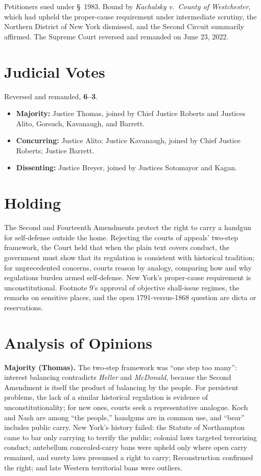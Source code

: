 \documentclass[12pt]{article}
\begin{document}
Petitioners sued under \S~1983. Bound by \textit{Kachalsky v.\ County of Westchester}, which had upheld the proper-cause requirement under intermediate scrutiny, the Northern District of New York dismissed, and the Second Circuit summarily affirmed. The Supreme Court reversed and remanded on June 23, 2022.

\section{Judicial Votes}

Reversed and remanded, \textbf{6--3}.
\begin{itemize}
\item \textbf{Majority:} Justice Thomas, joined by Chief Justice Roberts and Justices Alito, Gorsuch, Kavanaugh, and Barrett.
\item \textbf{Concurring:} Justice Alito; Justice Kavanaugh, joined by Chief Justice Roberts; Justice Barrett.
\item \textbf{Dissenting:} Justice Breyer, joined by Justices Sotomayor and Kagan.
\end{itemize}

\section{Holding}

The Second and Fourteenth Amendments protect the right to carry a handgun for self-defense outside the home. Rejecting the courts of appeals' two-step framework, the Court held that when the plain text covers conduct, the government must show that its regulation is consistent with historical tradition; for unprecedented concerns, courts reason by analogy, comparing how and why regulations burden armed self-defense. New York's proper-cause requirement is unconstitutional. Footnote 9's approval of objective shall-issue regimes, the remarks on sensitive places, and the open 1791-versus-1868 question are dicta or reservations.

\section{Analysis of Opinions}

\textbf{Majority (Thomas).} The two-step framework was ``one step too many'': interest balancing contradicts \textit{Heller} and \textit{McDonald}, because the Second Amendment is itself the product of balancing by the people. For persistent problems, the lack of a similar historical regulation is evidence of unconstitutionality; for new ones, courts seek a representative analogue. Koch and Nash are among ``the people,'' handguns are in common use, and ``bear'' includes public carry. New York's history failed: the Statute of Northampton came to bar only carrying to terrify the public; colonial laws targeted terrorizing conduct; antebellum concealed-carry bans were upheld only where open carry remained, and surety laws presumed a right to carry; Reconstruction confirmed the right; and late Western territorial bans were outliers.
\end{document}
